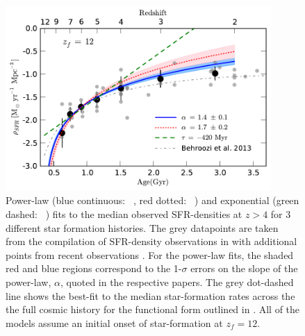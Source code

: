 \begin{figure}
    \centering
  \includegraphics[width=0.9\textwidth]{plots/Fig4.pdf}
  \caption[Power-law (blue continuous: \citeauthor{Salmon:2014tm}~\citeyear{Salmon:2014tm}, red dotted: \citeauthor{2011MNRAS.412.1123P}~\citeyear{2011MNRAS.412.1123P}) and exponential (green dashed: \citeauthor{2011MNRAS.412.1123P}~\citeyear{2011MNRAS.412.1123P}) fits to the median observed SFR-densities at $z > 4$ for 3 different star formation histories.]{Power-law (blue continuous: \citeauthor{Salmon:2014tm}~\citeyear{Salmon:2014tm}, red dotted: \citeauthor{2011MNRAS.412.1123P}~\citeyear{2011MNRAS.412.1123P}) and exponential (green dashed: \citeauthor{2011MNRAS.412.1123P}~\citeyear{2011MNRAS.412.1123P}) fits to the median observed SFR-densities at $z > 4$ for 3 different star formation histories. The grey datapoints are taken from the compilation of SFR-density observations in \citet{Behroozi:2013fg} with additional points from recent observations \citep{Smit:2012is,Bouwens:2014tx,Duncan:2014gh}. For the power-law fits, the shaded red and blue regions correspond to the 1-$\sigma$ errors on the slope of the power-law, $\alpha$, quoted in the respective papers.  The grey dot-dashed line shows the best-fit to the median star-formation rates across the the full cosmic history for the functional form outlined in \citet{Behroozi:2013fg}. All of the models assume an initial onset of star-formation at $z_{f} = 12$.}
  \label{fig:SFH}
\end{figure}

